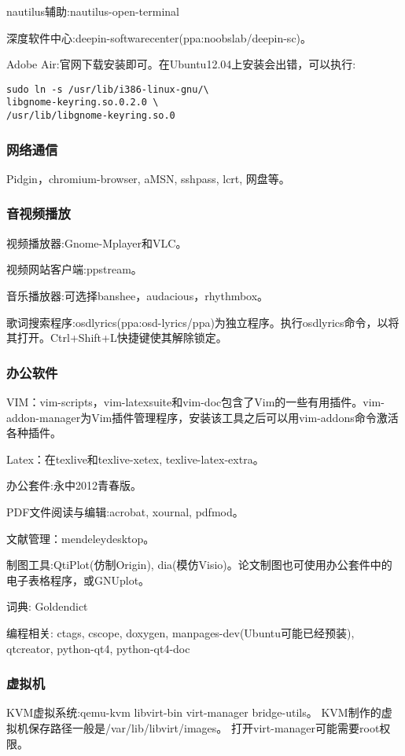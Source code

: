 nautilus辅助:nautilus-open-terminal

深度软件中心:deepin-softwarecenter(ppa:noobslab/deepin-sc)。

Adobe Air:官网下载安装即可。在Ubuntu12.04上安装会出错，可以执行:
\begin{verbatim}
sudo ln -s /usr/lib/i386-linux-gnu/\
libgnome-keyring.so.0.2.0 \
/usr/lib/libgnome-keyring.so.0
\end{verbatim}

\subsubsection{网络通信}
Pidgin，chromium-browser, aMSN, sshpass, lcrt, 网盘等。

\subsubsection{音视频播放}
视频播放器:Gnome-Mplayer和VLC。

视频网站客户端:ppstream。

音乐播放器:可选择banshee，audacious，rhythmbox。

歌词搜索程序:osdlyrics(ppa:osd-lyrics/ppa)为独立程序。执行osdlyrics命令，以将其打开。Ctrl+Shift+L快捷键使其解除锁定。

\subsubsection{办公软件}

VIM：vim-scripts，vim-latexsuite和vim-doc包含了Vim的一些有用插件。vim-addon-manager为Vim插件管理程序，安装该工具之后可以用vim-addons命令激活各种插件。

Latex：在texlive和texlive-xetex, texlive-latex-extra。

办公套件:永中2012青春版。

PDF文件阅读与编辑:acrobat, xournal, pdfmod。 

文献管理：mendeleydesktop。

制图工具:QtiPlot(仿制Origin), dia(模仿Visio)。论文制图也可使用办公套件中的电子表格程序，或GNUplot。 

词典: Goldendict

编程相关: ctags, cscope, doxygen, manpages-dev(Ubuntu可能已经预装), qtcreator, python-qt4, python-qt4-doc

\subsubsection{虚拟机}
KVM虚拟系统:qemu-kvm libvirt-bin virt-manager bridge-utils。
KVM制作的虚拟机保存路径一般是/var/lib/libvirt/images。
打开virt-manager可能需要root权限。


